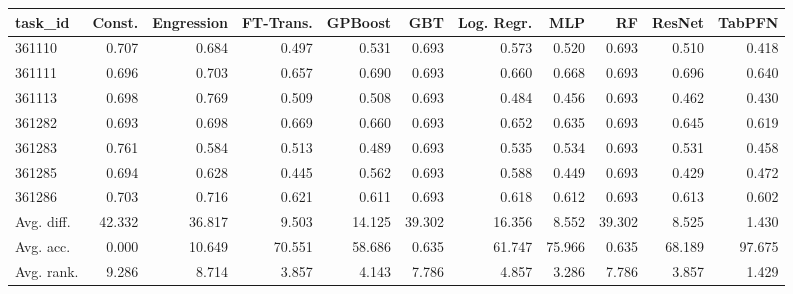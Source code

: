 \begin{tabular}{lrrrrrrrrrr}
\toprule
task\_id & Const. & Engression & FT-Trans. & GPBoost & GBT & Log. Regr. & MLP & RF & ResNet & TabPFN \\
\midrule
361110 & 0.707 & 0.684 & 0.497 & 0.531 & 0.693 & 0.573 & 0.520 & 0.693 & 0.510 & 0.418 \\
361111 & 0.696 & 0.703 & 0.657 & 0.690 & 0.693 & 0.660 & 0.668 & 0.693 & 0.696 & 0.640 \\
361113 & 0.698 & 0.769 & 0.509 & 0.508 & 0.693 & 0.484 & 0.456 & 0.693 & 0.462 & 0.430 \\
361282 & 0.693 & 0.698 & 0.669 & 0.660 & 0.693 & 0.652 & 0.635 & 0.693 & 0.645 & 0.619 \\
361283 & 0.761 & 0.584 & 0.513 & 0.489 & 0.693 & 0.535 & 0.534 & 0.693 & 0.531 & 0.458 \\
361285 & 0.694 & 0.628 & 0.445 & 0.562 & 0.693 & 0.588 & 0.449 & 0.693 & 0.429 & 0.472 \\
361286 & 0.703 & 0.716 & 0.621 & 0.611 & 0.693 & 0.618 & 0.612 & 0.693 & 0.613 & 0.602 \\
Avg. diff. & 42.332 & 36.817 & 9.503 & 14.125 & 39.302 & 16.356 & 8.552 & 39.302 & 8.525 & 1.430 \\
Avg. acc. & 0.000 & 10.649 & 70.551 & 58.686 & 0.635 & 61.747 & 75.966 & 0.635 & 68.189 & 97.675 \\
Avg. rank. & 9.286 & 8.714 & 3.857 & 4.143 & 7.786 & 4.857 & 3.286 & 7.786 & 3.857 & 1.429 \\
\bottomrule
\end{tabular}
